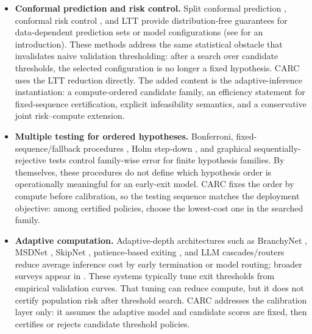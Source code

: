 \documentclass{ieeeaccess}
\begin{document}
\begin{itemize}
\item \textbf{Conformal prediction and risk control.} Split conformal prediction \cite{vovk2022algorithmic,lei2018distributionfree}, conformal risk control \cite{bates2021distributionfree,angelopoulos2024conformal}, and LTT \cite{angelopoulos2025learn} provide distribution-free guarantees for data-dependent prediction sets or model configurations (see \cite{angelopoulos2023gentle} for an introduction). These methods address the same statistical obstacle that invalidates naive validation thresholding: after a search over candidate thresholds, the selected configuration is no longer a fixed hypothesis. CARC uses the LTT reduction directly. The added content is the adaptive-inference instantiation: a compute-ordered candidate family, an efficiency statement for fixed-sequence certification, explicit infeasibility semantics, and a conservative joint risk--compute extension.
\item \textbf{Multiple testing for ordered hypotheses.} Bonferroni, fixed-sequence/fallback procedures \cite{wiens2003fixed}, Holm step-down \cite{holm1979simple}, and graphical sequentially-rejective tests \cite{bretz2008graphical} control family-wise error for finite hypothesis families. By themselves, these procedures do not define which hypothesis order is operationally meaningful for an early-exit model. CARC fixes the order by compute before calibration, so the testing sequence matches the deployment objective: among certified policies, choose the lowest-cost one in the searched family.
\item \textbf{Adaptive computation.} Adaptive-depth architectures such as BranchyNet \cite{teerapittayanon2016branchynet}, MSDNet \cite{huang2018multiscale}, SkipNet \cite{wang2018skipnet}, patience-based exiting \cite{zhou2020bert}, and LLM cascades/routers \cite{chen2023frugalgpt} reduce average inference cost by early termination or model routing; broader surveys appear in \cite{han2022dynamic,scardapane2020early}. These systems typically tune exit thresholds from empirical validation curves. That tuning can reduce compute, but it does not certify population risk after threshold search. CARC addresses the calibration layer only: it assumes the adaptive model and candidate scores are fixed, then certifies or rejects candidate threshold policies.

\end{itemize}
\end{document}
